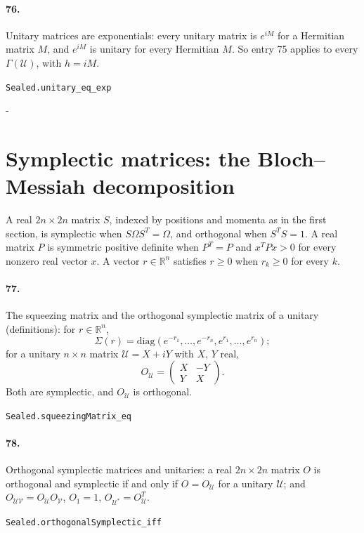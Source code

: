 \documentclass[11pt]{article}
\makeatletter
\newcommand{\keepspace}[1]{\par\penalty-100\begingroup\setlength{\dimen@}{#1}\dimen@ii\pagegoal\advance\dimen@ii-\pagetotal\ifdim\dimen@>\dimen@ii\ifdim\dimen@ii>\z@\vfil\fi\break\fi\endgroup}
\makeatother
\begin{document}
\paragraph{76.} Unitary matrices are exponentials: every unitary matrix is $e^{iM}$ for a Hermitian matrix $M$, and $e^{iM}$ is unitary for every Hermitian $M$. So entry 75 applies to every $\Gamma(\mathcal U)$, with $h = iM$.\par{\footnotesize\texttt{Sealed.unitary\_eq\_exp}}

\keepspace{14\baselineskip}\section*{Symplectic matrices: the Bloch–Messiah decomposition}
A real $2n \times 2n$ matrix $S$, indexed by positions and momenta as in the first section, is symplectic when $S \Omega S^T = \Omega$, and orthogonal when $S^T S = 1$. A real matrix $P$ is symmetric positive definite when $P^T = P$ and $x^T P x > 0$ for every nonzero real vector $x$. A vector $r \in \mathbb R^n$ satisfies $r \ge 0$ when $r_k \ge 0$ for every $k$.

\paragraph{77.} The squeezing matrix and the orthogonal symplectic matrix of a unitary (definitions): for $r \in \mathbb R^n$, \[\Sigma(r) = \mathrm{diag}(e^{-r_1}, \dots, e^{-r_n}, e^{r_1}, \dots, e^{r_n});\] for a unitary $n \times n$ matrix $\mathcal U = X + iY$ with $X$, $Y$ real, \[O_{\mathcal U} = \begin{pmatrix} X & -Y \\ Y & X \end{pmatrix}.\] Both are symplectic, and $O_{\mathcal U}$ is orthogonal.\par{\footnotesize\texttt{Sealed.squeezingMatrix\_eq}}

\paragraph{78.} Orthogonal symplectic matrices and unitaries: a real $2n \times 2n$ matrix $O$ is orthogonal and symplectic if and only if $O = O_{\mathcal U}$ for a unitary $\mathcal U$; and $O_{\mathcal U \mathcal V} = O_{\mathcal U} O_{\mathcal V}$, $O_1 = 1$, $O_{\mathcal U^*} = O_{\mathcal U}^T$.\par{\footnotesize\texttt{Sealed.orthogonalSymplectic\_iff}}
\end{document}
